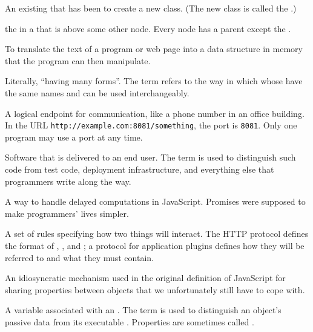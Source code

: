 \begin{description}
An existing  that has been  to create a
new class. (The new class is called the .)

the  in a  that is above some other node. Every
node has a parent except the .

To translate the text of a program or web page into a data structure in memory
that the program can then manipulate.

Literally, ``having many forms''. The term refers to the way in which
 whose  have the same names and
 can be used interchangeably.

A logical endpoint for communication, like a phone number in an office
building. In the URL \texttt{http://example.com:8081/something}, the port is \texttt{8081}.
Only one program may use a port at any time.

Software that is delivered to an end user. The term is used to distinguish
such code from test code, deployment infrastructure, and everything else that
programmers write along the way.

A way to handle delayed computations in JavaScript. Promises were supposed to
make programmers' lives simpler.

A set of rules specifying how two things will interact. The HTTP protocol
defines the format of ,
, and ; a
protocol for application plugins defines how they will be referred to and what
 they must contain.

An idiosyncratic mechanism used in the original definition of JavaScript for
sharing properties between objects that we unfortunately still have to cope
with.

A variable associated with an . The term is used to
distinguish an object's passive data from its executable .
Properties are sometimes called .


\end{description}
